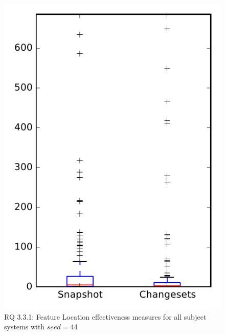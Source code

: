 
\begin{figure}
\centering
\includegraphics[height=0.4\textheight]{figures/flt_seed/rq1_overview_44}
\caption{RQ 3.3.1: Feature Location effectiveness measures for all subject systems with $seed=44$}
\label{fig:flt_seed:rq1:overview}
\end{figure}
